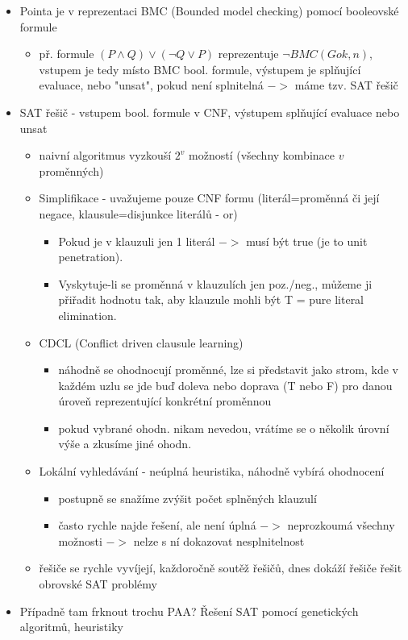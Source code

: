 \documentclass[a4paper,hidelinks]{article}
\begin{document}
\begin{itemize}
    \item Pointa je v reprezentaci BMC (Bounded model checking) pomocí booleovské formule
    \begin{itemize}
        \item př. formule $(P\wedge Q)\vee(\neg Q\vee P)$ reprezentuje $\neg BMC(G ok, n)$, vstupem je tedy místo BMC bool. formule, výstupem je splňující evaluace, nebo "unsat", pokud není splnitelná $->$ máme tzv. SAT řešič
    \end{itemize}
    \item SAT řešič - vstupem bool. formule v CNF, výstupem splňující evaluace nebo unsat
    \begin{itemize}
        \item naivní algoritmus vyzkouší $2^v$ možností (všechny kombinace $v$ proměnných)
        \item Simplifikace - uvažujeme pouze CNF formu (literál=proměnná či její negace, klausule=disjunkce literálů - or)
        \begin{itemize}
            \item Pokud je v klauzuli jen 1 literál $->$ musí být true (je to unit penetration).
            \item Vyskytuje-li se proměnná v klauzulích jen poz./neg., můžeme ji přiřadit hodnotu tak, aby klauzule mohli být T = pure literal elimination.
        \end{itemize}
        \item CDCL (Conflict driven clausule learning)
        \begin{itemize}
            \item náhodně se ohodnocují proměnné, lze si představit jako strom, kde v každém uzlu se jde buď doleva nebo doprava (T nebo F) pro danou úroveň reprezentující konkrétní proměnnou
            \item pokud vybrané ohodn. nikam nevedou, vrátíme se o několik úrovní výše a zkusíme jiné ohodn.
        \end{itemize}
        \item Lokální vyhledávání - neúplná heuristika, náhodně vybírá ohodnocení
        \begin{itemize}
            \item postupně se snažíme zvýšit počet splněných klauzulí
            \item často rychle najde řešení, ale není úplná $->$ neprozkoumá všechny možnosti $->$ nelze s ní dokazovat nesplnitelnost
        \end{itemize}
        \item řešiče se rychle vyvíjejí, každoročně soutěž řešičů, dnes dokáží řešiče řešit obrovské SAT problémy
    \end{itemize}
    \item Případně tam frknout trochu PAA? Řešení SAT pomocí genetických algoritmů, heuristiky
\end{itemize}
\end{document}
